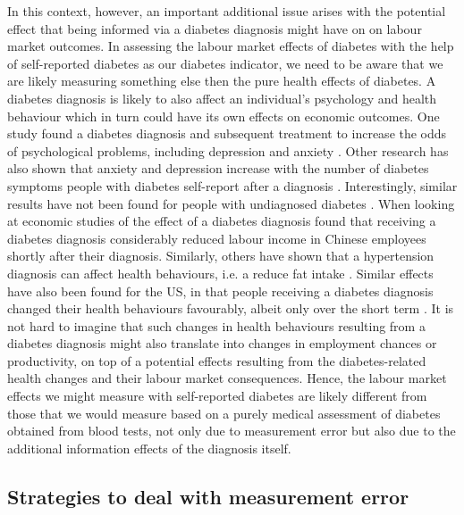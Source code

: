 \documentclass[12pt,english,british]{article}
\providecommand{\tabularnewline}{\\}
\begin{document}
In this context, however, an important additional issue arises with the potential effect that being informed via a diabetes diagnosis
might have on on labour market outcomes. In assessing the labour market
effects of diabetes with the help of self-reported diabetes as our
diabetes indicator, we need to be aware that we are likely measuring
something else then the pure health effects of diabetes. A diabetes
diagnosis is likely to also affect an individual's psychology and
health behaviour which in turn could have its own effects on economic
outcomes. One study found a diabetes diagnosis and subsequent treatment
to increase the odds of psychological problems, including depression
and anxiety \citep{17003303}. Other research has also shown that
anxiety and depression increase with the number of diabetes symptoms
people with diabetes self-report after a diagnosis \cite{Paddison_2011}.
Interestingly, similar results have not been found for people with
undiagnosed diabetes \citep{Nouwen2011}. When looking at economic
studies of the effect of a diabetes diagnosis \citet{Liu2014} found
that receiving a diabetes diagnosis considerably reduced labour income
in Chinese employees shortly after their diagnosis. Similarly, others
have shown that a hypertension diagnosis can affect health
behaviours, i.e. a reduce fat intake \citep{Zhao2013a}. Similar effects have also been found
for the US, in that people receiving a diabetes diagnosis changed
their health behaviours favourably, albeit only over the short term
\citep{Slade2012}. It is not hard to imagine that such changes in
health behaviours resulting from a diabetes diagnosis might also translate
into changes in employment chances or productivity, on top of a potential
effects resulting from the diabetes-related health changes and their
labour market consequences. Hence, the labour market effects we might
measure with self-reported diabetes are likely different from those
that we would measure based on a purely medical assessment of diabetes
obtained from blood tests, not only due to measurement error but also
due to the additional information effects of the diagnosis itself.



\providecommand{\tabularnewline}{\\}

\subsection{Strategies to deal with measurement error}
\end{document}
